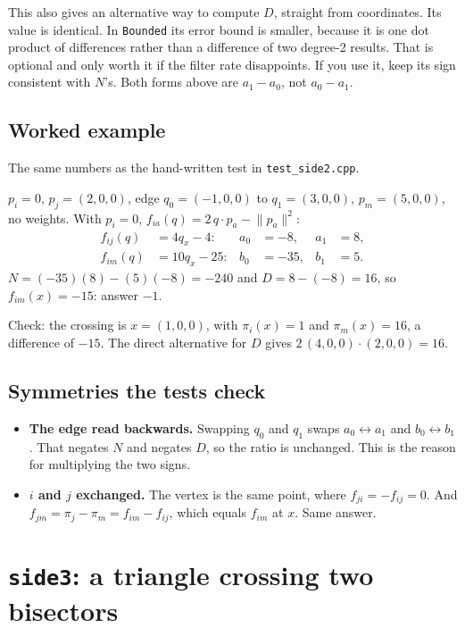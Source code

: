\documentclass[11pt,a4paper]{article}
\newcommand{\code}[1]{\texttt{#1}}
\newcommand{\norm}[1]{\lVert #1\rVert}
\theoremstyle{remark}
\begin{document}
This also gives an alternative way to compute $D$, straight from coordinates. Its value is
identical. In \code{Bounded} its error bound is smaller, because it is one dot product of
differences rather than a difference of two degree-2 results. That is optional and only worth it
if the filter rate disappoints. If you use it, keep its sign consistent with $N$'s. Both forms
above are $a_1 - a_0$, not $a_0 - a_1$.

\subsection{Worked example}
The same numbers as the hand-written test in \code{test\_side2.cpp}.

$p_i = 0$, $p_j = (2,0,0)$, edge $q_0 = (-1,0,0)$ to $q_1 = (3,0,0)$, $p_m = (5,0,0)$, no
weights. With $p_i = 0$, $f_{ia}(q) = 2\,q\cdot p_a - \norm{p_a}^2$:
\begin{align*}
  f_{ij}(q) &= 4q_x - 4: & a_0 &= -8, & a_1 &= 8,\\
  f_{im}(q) &= 10q_x - 25: & b_0 &= -35, & b_1 &= 5.
\end{align*}
$N = (-35)(8) - (5)(-8) = -240$ and $D = 8 - (-8) = 16$, so $f_{im}(x) = -15$: answer $-1$.

Check: the crossing is $x = (1,0,0)$, with $\pi_i(x) = 1$ and $\pi_m(x) = 16$, a difference of
$-15$. The direct alternative for $D$ gives $2\,(4,0,0)\cdot(2,0,0) = 16$. \checkmark

\subsection{Symmetries the tests check}

\begin{itemize}
  \item \textbf{The edge read backwards.} Swapping $q_0$ and $q_1$ swaps $a_0 \leftrightarrow a_1$
    and $b_0 \leftrightarrow b_1$. That negates $N$ and negates $D$, so the ratio is unchanged.
    This is the reason for multiplying the two signs.
  \item \textbf{$i$ and $j$ exchanged.} The vertex is the same point, where $f_{ji} = -f_{ij} = 0$.
    And $f_{jm} = \pi_j - \pi_m = f_{im} - f_{ij}$, which equals $f_{im}$ at $x$. Same answer.
\end{itemize}

\section{\texorpdfstring{\code{side3}}{side3}: a triangle crossing two bisectors}\label{sec:side3}
\end{document}
